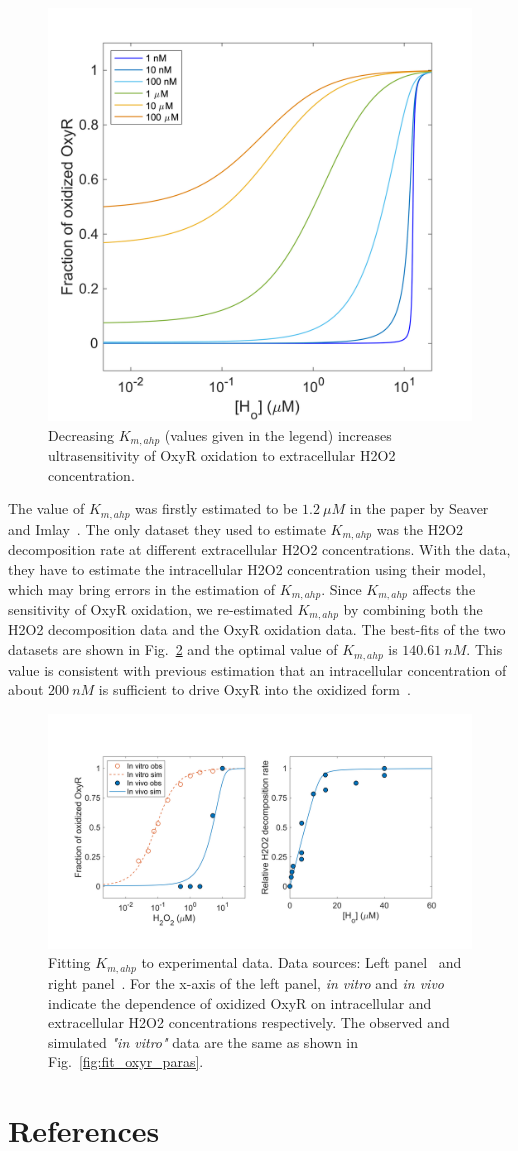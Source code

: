 \documentclass[10pt]{article}
\begin{document}
\begin{figure}[H]
\centering
  \includegraphics[width=0.5\linewidth]{ultrasensitivity_oxyr_decrease_Kmahp.png}
  \caption{Decreasing $K_{m,ahp}$ (values given in the legend) increases ultrasensitivity of OxyR oxidation to extracellular H2O2 concentration.}
  \label{fig:decrease_kmahp}
\end{figure}

The value of $K_{m,ahp}$ was firstly estimated to be $1.2~\mu M$ in the paper by Seaver and Imlay~\cite{seaver2001hydrogen}. The only dataset they used to estimate $K_{m,ahp}$ was the H2O2 decomposition rate at different extracellular H2O2 concentrations. With the data, they have to estimate the intracellular H2O2 concentration using their model, which may bring errors in the estimation of $K_{m,ahp}$. Since $K_{m,ahp}$ affects the sensitivity of OxyR oxidation, we re-estimated $K_{m,ahp}$ by combining both the H2O2 decomposition data and the OxyR oxidation data. The best-fits of the two datasets are shown in Fig.~\ref{fig:fit_kmahp} and the optimal value of $K_{m,ahp}$ is $140.61~nM$. This value is consistent with previous estimation that an intracellular concentration of about $200~nM$ is sufficient to drive OxyR into the oxidized form~\cite{imlay2013molecular}.

\begin{figure}[H]
\centering
  \includegraphics[width=0.85\linewidth]{fitting_results_Kmahp.png}
  \caption{Fitting $K_{m,ahp}$ to experimental data. Data sources: Left panel~\cite{aaslund1999regulation} and right panel~\cite{seaver2001hydrogen}. For the x-axis of the left panel, \textit{in vitro} and \textit{in vivo} indicate the dependence of oxidized OxyR on intracellular and extracellular H2O2 concentrations respectively. The observed and simulated \textit{"in vitro"} data are the same as shown in Fig.~\ref{fig:fit_oxyr_paras}.}
  \label{fig:fit_kmahp}
\end{figure}



\clearpage
\section{References}
 

\end{document}
